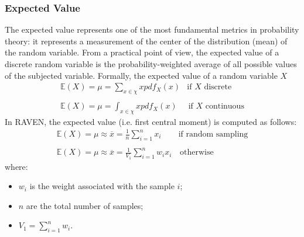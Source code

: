 \subsubsection{Expected Value}
The expected value represents one of the most fundamental metrics in probability theory: it represents a measurement of the center of the distribution (mean) of the random variable. 
From a practical point of view, the expected value of a discrete random variable is the probability-weighted average of all possible values of the subjected variable. Formally, the expected value of a random variable $X$
\begin{equation}
\begin{matrix}
\mathbb{E}(X) = \mu = \sum_{x \in \chi} x  pdf_{X}(x) & \text{if  $X$  discrete} \\ 
\\ 
\mathbb{E}(X) = \mu = \int_{x \in \chi} x pdf_{X}(x) & \, \text{if $X$ continuous}
\end{matrix}
\end{equation}
In RAVEN, the expected value (i.e. first central moment) is computed as follows:
\begin{equation}
\begin{matrix}
\mathbb{E}(X) = \mu \approx \overline{x} = \frac{1}{n} \sum_{i=1}^{n}  x_{i} & \text{if  random sampling} \\ 
\\ 
\mathbb{E}(X) = \mu \approx \overline{x} = \frac{1}{V_{1}} \sum_{i=1}^{n} w_{i}  x_{i}  & \, \text{otherwise}
\end{matrix}
\end{equation}
where:
\begin{itemize}
  \item $w_{i}$ is the weight associated with the sample $i$;
  \item $n$ are the total number of samples;
  \item $V_{1} = \sum_{i=1}^{n} w_{i}$.
\end{itemize}
